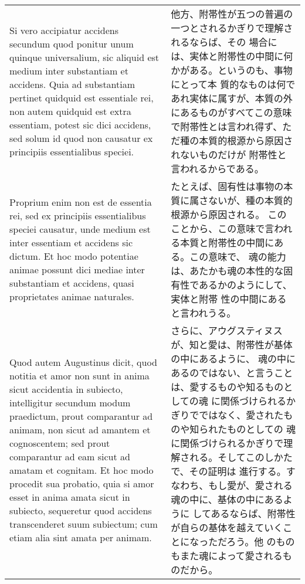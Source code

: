 \documentclass[paper=a4paper,fontsize=10pt,jafontsize=9pt,titlepage]{jlreq}
\begin{document}
\begin{longtable}{p{21em}p{21em}}
\\



 Si vero accipiatur accidens secundum quod ponitur unum quinque
universalium, sic aliquid est medium inter substantiam et
accidens. Quia ad substantiam pertinet quidquid est essentiale rei,
non autem quidquid est extra essentiam, potest sic dici accidens, sed
solum id quod non causatur ex principiis essentialibus speciei.

&


 他方、附帯性が五つの普遍の一つとされるかぎりで理解されるならば、その
 場合には、実体と附帯性の中間に何かがある。というのも、事物にとって本
 質的なものは何であれ実体に属すが、本質の外にあるものがすべてこの意味
 で附帯性とは言われ得ず、ただ種の本質的根源から原因されないものだけが
 附帯性と言われるからである。

\\


 Proprium enim non est de essentia rei, sed ex principiis
essentialibus speciei causatur, unde medium est inter essentiam et
accidens sic dictum. Et hoc modo potentiae animae possunt dici mediae
inter substantiam et accidens, quasi proprietates animae naturales.

&

たとえば、固有性は事物の本質に属さないが、種の本質的根源から原因される。
このことから、この意味で言われる本質と附帯性の中間にある。この意味で、
魂の能力は、あたかも魂の本性的な固有性であるかのようにして、実体と附帯
性の中間にあると言われうる。
 

\\


 Quod autem Augustinus dicit, quod notitia et amor non sunt
in anima sicut accidentia in subiecto, intelligitur secundum modum
praedictum, prout comparantur ad animam, non sicut ad amantem et
cognoscentem; sed prout comparantur ad eam sicut ad amatam et
cognitam. Et hoc modo procedit sua probatio, quia si amor esset in
anima amata sicut in subiecto, sequeretur quod accidens transcenderet
suum subiectum; cum etiam alia sint amata per animam.

&

 さらに、アウグスティヌスが、知と愛は、附帯性が基体の中にあるように、
 魂の中にあるのではない、と言うことは、愛するものや知るものとしての魂
 に関係づけられるかぎりでではなく、愛されたものや知られたものとしての
 魂に関係づけられるかぎりで理解される。そしてこのしかたで、その証明は
 進行する。すなわち、もし愛が、愛される魂の中に、基体の中にあるように
 してあるならば、附帯性が自らの基体を越えていくことになっただろう。他
 のものもまた魂によって愛されるものだから。



\end{longtable}
\end{document}

